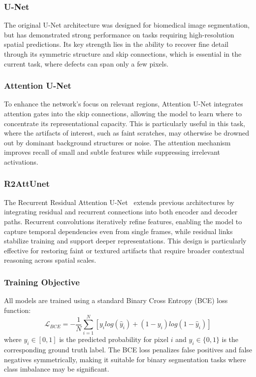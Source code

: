 \documentclass[10pt,a4paper,twocolumn,twoside]{article}
\begin{document}
\subsubsection*{U-Net}
The original U-Net architecture \cite{unet} was designed for biomedical image segmentation, but has demonstrated strong performance on tasks requiring high-resolution spatial predictions. Its key strength lies in the ability to recover fine detail through its symmetric structure and skip connections, which is essential in the current task, where defects can span only a few pixels.
\subsubsection*{Attention U-Net}
To enhance the network's focus on relevant regions, Attention U-Net \cite{attunet} integrates attention gates into the skip connections, allowing the model to learn where to concentrate its representational capacity. This is particularly useful in this task, where the artifacts of interest, such as faint scratches, may otherwise be drowned out by dominant background structures or noise. The attention mechanism improves recall of small and subtle features while suppressing irrelevant activations.
\subsubsection*{R2AttUnet}
The Recurrent Residual Attention U-Net~\cite{r2attunet} extends previous architectures by integrating residual and recurrent connections into both encoder and decoder paths. Recurrent convolutions iteratively refine features, enabling the model to capture temporal dependencies even from single frames, while residual links stabilize training and support deeper representations. This design is particularly effective for restoring faint or textured artifacts that require broader contextual reasoning across spatial scales.
\subsubsection{Training Objective}
All models are trained using a standard Binary Cross Entropy (BCE) \cite{bceloss }loss function:
\begin{equation*}
    \mathcal{L}_{BCE} = -\frac{1}{N} \sum^N_{i=1}[y_ilog(\hat{y}_i)+(1-y_i)log(1-\hat{y}_i)]
\end{equation*}
where $\hat{y_i} \in [0,1]$ is the predicted probability for pixel $i$ and $y_i\in\{0,1\}$ is the corresponding ground truth label. The BCE loss penalizes false positives and false negatives symmetrically, making it suitable for binary segmentation tasks where class imbalance may be significant.
\end{document}
